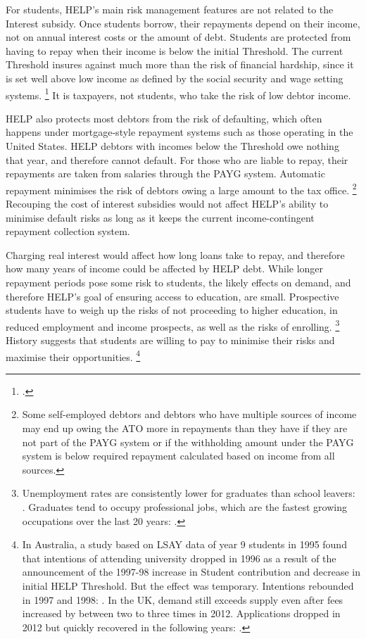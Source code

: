 \documentclass[embargoed]{grattan}
\begin{document}
For students, \gls{HELP}'s main risk management features are not related to the \gls{Interest subsidy}.
Once students borrow, their repayments depend on their income, not on annual interest costs or the amount of debt.
Students are protected from having to repay when their income is below the initial \gls{Threshold}.
The current \gls{Threshold} insures against much more than the risk of financial hardship, since it is set well above low income as defined by the social security and wage setting systems.%
\footcite[][Chapter~4]{Norton2016HELPfuturefairer} 
It is taxpayers, not students, who take the risk of low debtor income.

\gls{HELP} also protects most debtors from the risk of defaulting, which often happens under mortgage-style repayment systems such as those operating in the United States.
\gls{HELP} debtors with incomes below the \gls{Threshold} owe nothing that year, and therefore cannot default.
For those who are liable to repay, their repayments are taken from salaries through the \gls{PAYG} system.
Automatic repayment minimises the risk of debtors owing a large amount to the tax office.%
\footnote{Some self-employed debtors and debtors who have multiple sources of income may end up owing the \gls{ATO} more in repayments than they have if they are not part of the \gls{PAYG} system or if the withholding amount under the \gls{PAYG} system is below required repayment calculated based on income from all sources.} Recouping the cost of interest subsidies would not affect \gls{HELP}'s ability to minimise default risks as long as it keeps the current income-contingent repayment collection system.

Charging real interest would affect how long loans take to repay, and therefore how many years of income could be affected by \gls{HELP} debt.
While longer repayment periods pose some risk to students, the likely effects on demand, and therefore \gls{HELP}'s goal of ensuring access to education, are small.
Prospective students have to weigh up the risks of not proceeding to higher education, in reduced employment and income prospects, as well as the risks of enrolling.%
\footnote{Unemployment rates are consistently lower for graduates than school leavers: \textcite[][Table 10]{Norton2016MappingAustralianhigher}.
Graduates tend to occupy professional jobs, which are the fastest growing occupations over the last 20 years: \textcite{ABS2015LabourforceAustralia}.} History suggests that students are willing to pay to minimise their risks and maximise their opportunities.%
\footnote{In Australia, a study based on LSAY data of year 9 students in 1995 found that intentions of attending university dropped in 1996 as a result of the announcement of the 1997-98 increase in \gls{Student contribution} and decrease in initial \gls{HELP} \gls{Threshold}.
But the effect was temporary.
Intentions rebounded in 1997 and 1998: \textcite[][505]{Chapman2005accessimplicationsincome}.
In the UK, demand still exceeds supply even after fees increased by between two to three times in 2012.
Applications dropped in 2012 but quickly recovered in the following years: \textcite[][Figures~4 and~27]{UCAS20152015endcycle}.}
\end{document}
